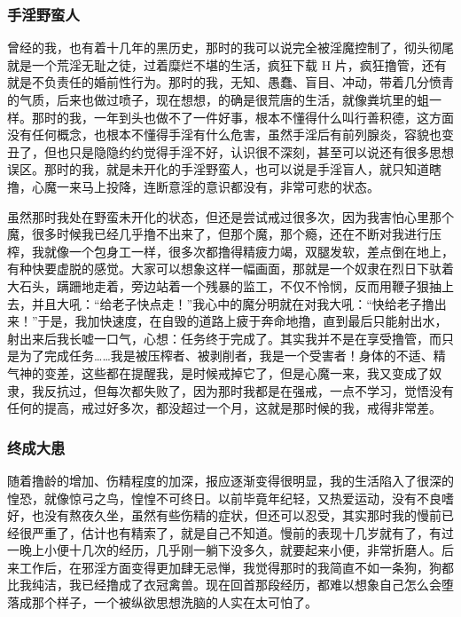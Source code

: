 \subsubsection{手淫野蛮人}

曾经的我，也有着十几年的黑历史，那时的我可以说完全被淫魔控制了，彻头彻尾就是一个荒淫无耻之徒，过着糜烂不堪的生活，疯狂下载 H 片，疯狂撸管，还有就是不负责任的婚前性行为。那时的我，无知、愚蠢、盲目、冲动，带着几分愤青的气质，后来也做过喷子，现在想想，的确是很荒唐的生活，就像粪坑里的蛆一样。那时的我，一年到头也做不了一件好事，根本不懂得什么叫行善积德，这方面没有任何概念，也根本不懂得手淫有什么危害，虽然手淫后有前列腺炎，容貌也变丑了，但也只是隐隐约约觉得手淫不好，认识很不深刻，甚至可以说还有很多思想误区。那时的我，就是未开化的手淫野蛮人，也可以说是手淫盲人，就只知道瞎撸，心魔一来马上投降，连断意淫的意识都没有，非常可悲的状态。

虽然那时我处在野蛮未开化的状态，但还是尝试戒过很多次，因为我害怕心里那个魔，很多时候我已经几乎撸不出来了，但那个魔，那个瘾，还在不断对我进行压榨，我就像一个包身工一样，很多次都撸得精疲力竭，双腿发软，差点倒在地上，有种快要虚脱的感觉。大家可以想象这样一幅画面，那就是一个奴隶在烈日下驮着大石头，蹒跚地走着，旁边站着一个残暴的监工，不仅不怜悯，反而用鞭子狠抽上去，并且大吼：“给老子快点走！”我心中的魔分明就在对我大吼：“快给老子撸出来！”于是，我加快速度，在自毁的道路上疲于奔命地撸，直到最后只能射出水，射出来后我长嘘一口气，心想：任务终于完成了。其实我并不是在享受撸管，而只是为了完成任务……我是被压榨者、被剥削者，我是一个受害者！身体的不适、精气神的变差，这些都在提醒我，是时候戒掉它了，但是心魔一来，我又变成了奴隶，我反抗过，但每次都失败了，因为那时我都是在强戒，一点不学习，觉悟没有任何的提高，戒过好多次，都没超过一个月，这就是那时候的我，戒得非常差。

\subsubsection{终成大患}

随着撸龄的增加、伤精程度的加深，报应逐渐变得很明显，我的生活陷入了很深的惶恐，就像惊弓之鸟，惶惶不可终日。以前毕竟年纪轻，又热爱运动，没有不良嗜好，也没有熬夜久坐，虽然有些伤精的症状，但还可以忍受，其实那时我的慢前已经很严重了，估计也有精索了，就是自己不知道。慢前的表现十几岁就有了，有过一晚上小便十几次的经历，几乎刚一躺下没多久，就要起来小便，非常折磨人。后来工作后，在邪淫方面变得更加肆无忌惮，我觉得那时的我简直不如一条狗，狗都比我纯洁，我已经撸成了衣冠禽兽。现在回首那段经历，都难以想象自己怎么会堕落成那个样子，一个被纵欲思想洗脑的人实在太可怕了。

